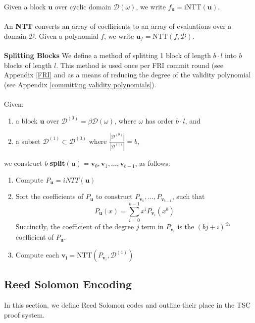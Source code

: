 \documentclass[10pt,letterpaper,titlepage]{article}
\newcommand{\w}[0]{\omega}
\newcommand{\D}[0]{\mathcal{D}}
\theoremstyle{definition}
\begin{document}
\begin{appendices}
Given a block $\mathbf{u}$ over cyclic domain $\D(\w)$, we write $f_{\mathbf{u}}=\text{iNTT}(\mathbf{u})$.  \\
\\
An \textbf{NTT} converts an array of coefficients to an array of evaluations over a domain $\D.$
Given a polynomial $f$, we write $\mathbf{u}_f = \text{NTT}(f,\D)$.\\
\\
\textbf{Splitting Blocks}
\label{split}
We define a method of splitting 1 block of length $b \cdot l$ into $b$ blocks of length $l$. 
This method is used once per FRI commit round (see Appendix \ref{FRI} and as a means of reducing the degree of the validity polynomial (see Appendix \ref{committing validity polynomials}).\\
\\
Given: 
\begin{enumerate}
  \item a block $\mathbf{u}$ over $\D^{(0)}=\beta\D(\w)$, where $\w$ has order $b \cdot l$, and
  \item a subset $\D^{(1)}\subset\D^{(0)}$ where $\frac{|\D^{(0)}|}{|\D^{(1)}|}=b$,
\end{enumerate}
we construct $b$-\textbf{split}$(\mathbf{u})=\mathbf{v}_0,\mathbf{v}_1,\ldots,\mathbf{v}_{b-1}$, as follows: 
\begin{enumerate}
  \item Compute $P_{\mathbf{u}} = iNTT(\mathbf{u})$
  \item Sort the coefficients of $P_{\mathbf{u}}$ to construct $P_{\mathbf{v}_0},\ldots,P_{\mathbf{v}_{b-1}}$, such that 
  \[P_{\mathbf{u}}(x)=\sum_{i=0}^{b-1}x^iP_{\mathbf{v}_i}(x^b)\]
  Succinctly, the coefficient of the degree $j$ term in $P_{\mathbf{v}_i}$ is the $(bj+i)^\text{th}$ coefficient of $P_\mathbf{u}$.
  \item Compute each $\mathbf{v_i} = \text{NTT}(P_{\mathbf{v}_i},\D^{(1)})$
\end{enumerate}
\subsection{Reed Solomon Encoding}
\label{reed solomon}
In this section, we define Reed Solomon codes and outline their place in the TSC proof system.

\end{appendices}
\end{document}
